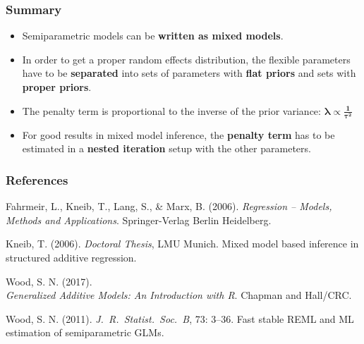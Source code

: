 \documentclass[final]{beamer}
\begin{document}
\begin{frame}
\frametitle{Summary}

\begin{itemize}
\item Semiparametric models can be \textbf{written as mixed models}.
\item In order to get a proper random effects distribution, the flexible parameters have to be \textbf{separated} into sets of parameters with \textbf{flat priors} and sets with \textbf{proper priors}.
\item The penalty term  is proportional to the inverse of the prior variance: $\mathbf{\boldsymbol{\lambda} \boldsymbol{\propto} \frac{1}{\boldsymbol{\tau}^2}}$
\item For good results in mixed model inference, the \textbf{penalty term} has to be estimated in a \textbf{nested iteration} setup with the other parameters.
\end{itemize}

\end{frame}


\appendix
\begin{frame}
\frametitle{References}
				\begin{thebibliography}{10}
				
Fahrmeir, L., Kneib, T., Lang, S., \&  Marx, B. (2006). {\em Regression -- Models, Methods and Applications}.
\newblock Springer-Verlag Berlin Heidelberg.

Kneib, T. (2006). {\em Doctoral Thesis}, LMU Munich.
\newblock Mixed model based inference in structured additive regression.

Wood, S. N. (2017). \\ {\em Generalized Additive Models: An Introduction with R}.
\newblock Chapman and Hall/CRC.

Wood, S. N. (2011). {\em J.\ R.\ Statist.\ Soc.\ B}, 73: 3--36.
\newblock Fast stable REML and ML estimation of semiparametric GLMs.

\end{thebibliography}
\end{frame}
\end{document}
